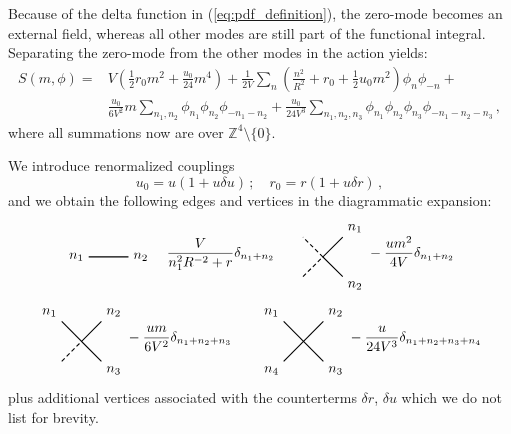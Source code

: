 \documentclass[11pt,a4paper]{article}
\begin{document}
Because of the delta function in (\ref{eq:pdf_definition}), the zero-mode
becomes an external field, whereas all other modes are still part of the
functional integral. Separating the zero-mode from the other modes in the
action yields:
\begin{equation}
\begin{split}
    S(m, \phi) =& 
    V \left(\frac{1}{2} r_0 m^2 + \frac{u_0}{24} m^4\right) +
    \frac{1}{2V} \sum_{n} \left(\frac{n^2}{R^2} + r_0 +
      \frac{1}{2} u_0m^2 \right)\phi_{n} \phi_{-n} +\\
    &\frac{u_0}{6V^2} m 
        \sum_{n_1, n_2} \phi_{n_1} \phi_{n_2} \phi_{-n_1 -n_2} +
    \frac{u_0}{24V^3} \sum_{n_1, n_2, n_3} \phi_{n_1} \phi_{n_2}
        \phi_{n_3} \phi_{-n_1 -n_2 -n_3}\,,
\end{split}
\end{equation}
where all summations now are over $\mathbb{Z}^4 \setminus \{0\}$.

We introduce renormalized couplings
\begin{equation}
    u_0 = u(1 + u\delta u)\,;\quad r_0 = r(1 + u \delta r)\,,
\end{equation}
and we obtain the following edges and vertices in the diagrammatic expansion:
\begin{displaymath}
\begin{tikzpicture}[scale=0.5, baseline=(current bounding box.center)]
    \draw[thick] (-1, 0) -- (1, 0);
    \node[left] at (-1, 0) {$n_1$};
    \node[right] at (1, 0) {$n_2$};
\end{tikzpicture}
    \quad
    \frac{V}{n_1^2R^{-2} + r}\delta_{n_1 + n_2}
\quad\quad
\begin{tikzpicture}[scale=0.5, baseline=(current bounding box.center)]
    \draw[densely dashed, thick] (-1, -1) -- (0, 0) -- (-1, 1);
    \draw[thick] (+1, -1) -- (0, 0) -- (+1, 1);
    \node[above right] at (1, 1) {$n_1$};
    \node[below right] at (1, -1) {$n_2$};
\end{tikzpicture}
    -\frac{um^2}{4V}\delta_{n_1 + n_2}
\end{displaymath}
\begin{displaymath}
\begin{tikzpicture}[scale=0.5, baseline=(current bounding box.center)]
    \draw[densely dashed, thick] (-1, -1) -- (0, 0);
    \draw[thick] (0, 0) -- (-1, 1);
    \draw[thick] (+1, -1) -- (0, 0) -- (+1, 1);
    \node[above left] at (-1, 1) {$n_1$};
    \node[above right] at (1, 1) {$n_2$};
    \node[below right] at (1, -1) {$n_3$};
\end{tikzpicture}
    -\frac{um}{6V^2}\delta_{n_1 + n_2 + n_3}
\quad\quad
\begin{tikzpicture}[scale=0.5, baseline=(current bounding box.center)]
    \draw[thick] (-1, -1) -- (1, 1);
    \draw[thick] (-1, 1) -- ( 1, -1);
    \node[above left] at (-1, 1) {$n_1$};
    \node[above right] at (1, 1) {$n_2$};
    \node[below right] at (1, -1) {$n_3$};
    \node[below left] at (-1, -1) {$n_4$};
\end{tikzpicture}
    -\frac{u}{24V^3}\delta_{n_1 + n_2 + n_3 + n_4}
\end{displaymath}
plus additional vertices associated with the counterterms $\delta r$, $\delta
u$ which we do not list for brevity.
\end{document}
